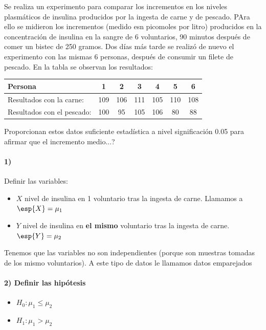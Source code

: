 \begin{problem}[6]
Se realiza un experimento para comparar los incrementos en los niveles plasmáticos de insulina producidos por la ingesta de carne y de pescado. PAra ello se midieron los incrementos (medido esn picomoles por litro) producidos en la concentración de insulina en la sangre de 6 voluntarios, 90 minutos después de comer un bistec de 250 gramos. Dos días más tarde se realizó de nuevo el experimento con las mismas 6 personas, después de consumir un filete de pescado. En la tabla se observan los resultados:

\begin{tabular} {|l|c|c|c|c|c|c|}
\hline
Persona & 1 & 2 & 3 & 4 & 5 & 6\\
\hline
Resultados con la carne: & 109& 106 & 111& 105 & 110 & 108\\
\hline
Resultados con el pescado: & 100& 95& 105& 106& 80& 88\\
\hline
\end{tabular}

\ppart Proporcionan estos datos suficiente estadística a nivel significación 0.05 para afirmar que el incremento medio...?
\solution

\spart 

\paragraph{1)} Definir las variables:
\begin{itemize}
\item $X$ nivel de insulina en 1 voluntario tras la ingesta de carne. Llamamos a $\esp{X} = \mu_1$
\item $Y$ nivel de insulina en \textbf{el mismo} voluntario tras la ingesta de carne. $\esp{Y} = \mu_2$
\end{itemize}

Tenemos que las variables no son independientes (porque son muestras tomadas de los mismo voluntarios). A este tipo de datos le llamamos datos emparejados 

\paragraph{2) Definir las hipótesis}
\begin{itemize}
\item $H_0: \mu_1 \leq \mu_2$
\item $H_1 : \mu_1>\mu_2$
\end{itemize}


\end{problem}
